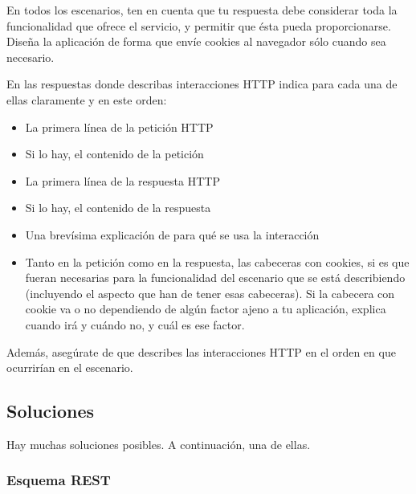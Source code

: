 En todos los escenarios, ten en cuenta que tu respuesta debe considerar toda la funcionalidad que ofrece el servicio, y permitir que ésta pueda proporcionarse. Diseña la aplicación de forma que envíe cookies al navegador sólo cuando sea necesario.

En las respuestas donde describas interacciones HTTP indica para cada una de ellas claramente y en este orden:
  \begin{itemize}
  \item La primera línea de la petición HTTP
  \item Si lo hay, el contenido de la petición
  \item La primera línea de la respuesta HTTP
  \item Si lo hay, el contenido de la respuesta
  \item Una brevísima explicación de para qué se usa la interacción
  \item Tanto en la petición como en la respuesta, las cabeceras con cookies, si es que fueran necesarias para la funcionalidad del escenario que se está describiendo (incluyendo el aspecto que han de tener esas cabeceras). Si la cabecera con cookie va o no dependiendo de algún factor ajeno a tu aplicación, explica cuando irá y cuándo no, y cuál es ese factor.
  \end{itemize}

Además, asegúrate de que describes las interacciones HTTP en el orden en que ocurrirían en el escenario.


\subsection*{Soluciones}

Hay muchas soluciones posibles. A continuación, una de ellas.

\subsubsection*{Esquema REST}

